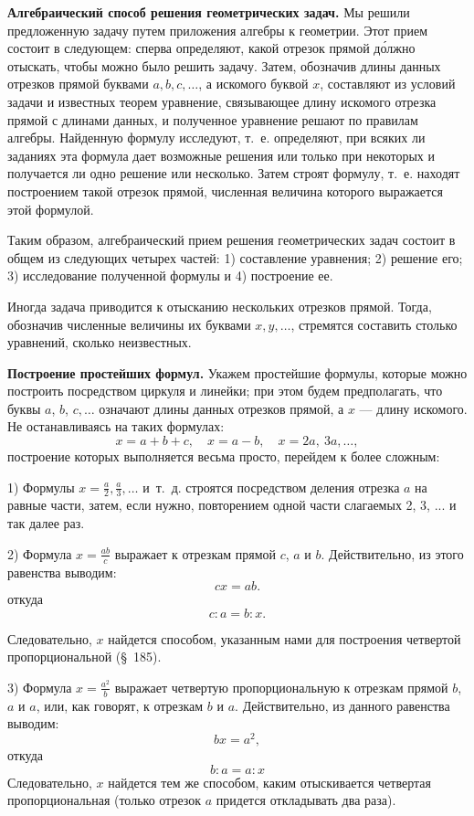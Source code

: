 \documentclass[oneside]{book}
\begin{document}
\textbf{Алгебраический способ решения геометрических задач.}
Мы решили предложенную задачу путем приложения алгебры к геометрии.
Этот прием состоит в следующем:
сперва определяют, какой отрезок прямой д\'{о}лжно отыскать, чтобы можно было решить задачу.
Затем, обозначив длины данных отрезков прямой буквами $a, b, c,\dots$, а искомого буквой $x$, составляют из условий задачи и известных теорем уравнение, связывающее длину искомого отрезка прямой с длинами данных, и полученное уравнение решают по правилам алгебры.
Найденную формулу исследуют, т.~е. определяют, при всяких ли заданиях эта формула дает возможные решения или только при некоторых и получается ли одно решение или несколько.
Затем строят формулу, т.~е. находят построением такой отрезок прямой, численная величина которого выражается этой формулой.

Таким образом, алгебраический прием решения геометрических задач состоит в общем из следующих четырех частей:
1) составление уравнения;
2) решение его;
3) исследование полученной формулы и 4) построение ее.

Иногда задача приводится к отысканию нескольких отрезков прямой.
Тогда, обозначив численные величины их буквами $x,y,\dots$, стремятся составить столько уравнений, сколько неизвестных.

\textbf{Построение простейших формул.}
Укажем простейшие формулы, которые можно построить посредством циркуля и линейки;
при этом будем предполагать, что буквы $a$, $b$, $c,\dots$
означают длины данных отрезков прямой, а $x$ — длину искомого.
Не останавливаясь на таких формулах:
\[x=a+b+c,
 \quad
 x=a-b,
 \quad
 x=2a,\ 3a,\dots,
\]
построение которых выполняется весьма просто, перейдем к более сложным:


1) Формулы $x=\frac a2, \frac a3,\dots$ и~т.~д. строятся посредством деления отрезка $a$ на равные части, затем, если нужно, повторением одной части слагаемых 2, 3, ...
и так далее раз.

2) Формула $x=\frac{ab}c$ выражает  к отрезкам прямой $c$, $a$ и $b$.
Действительно, из этого равенства выводим:
\[cx=ab.\]
откуда
\[c:a=b:x.\]

Следовательно, $x$ найдется способом, указанным нами для построения четвертой пропорциональной (§~185).

3) Формула $x=\frac{a^2}b$ выражает четвертую пропорциональную к отрезкам прямой $b$, $a$ и $a$, или, как говорят,  к отрезкам $b$ и $a$.
Действительно, из данного равенства выводим:
\[bx=a^2,\]
откуда
\[b:a=a:x\]
Следовательно, $x$ найдется тем же способом, каким отыскивается четвертая пропорциональная (только отрезок $a$ придется откладывать два раза).
\end{document}
